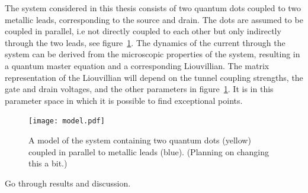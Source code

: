\documentclass[../main.tex]{subfiles}
\begin{document}
The system considered in this thesis consists of two quantum dots coupled to two metallic leads, corresponding to the source and drain. The dots are assumed to be coupled in parallel, i.e not directly coupled to each other but only indirectly through the two leads, see figure~\ref{fig:model}. The dynamics of the current through the system can be derived from the microscopic properties of the system, resulting in a quantum master equation and a corresponding Liouvillian. The matrix representation of the Liouvillian will depend on the tunnel coupling strengths, the gate and drain voltages, and the other parameters in figure~\ref{fig:model}. It is in this parameter space in which it is possible to find exceptional points.

\begin{figure}[H]
    \centering
    \texttt{[image: model.pdf]}
    \caption{A model of the system containing two quantum dots (yellow) coupled in parallel to metallic leads (blue). (Planning on changing this a bit.)}
    \label{fig:model}
\end{figure}

Go through results and discussion.
\end{document}
